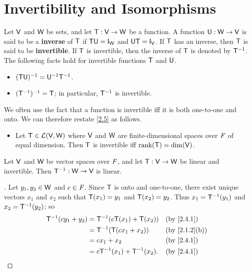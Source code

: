 \section{Invertibility and Isomorphisms}\label{sec:2.4}

\begin{defn}\label{2.4.1}
  Let \(\mathsf{V}\) and \(\mathsf{W}\) be sets, and let \(\mathsf{T} : \mathsf{V} \to \mathsf{W}\) be a function.
  A function \(\mathsf{U} : \mathsf{W} \to \mathsf{V}\) is said to be a \textbf{inverse} of \(\mathsf{T}\) if \(\T \U = \IT[\W]\) and \(\U \T = \IT[\V]\).
  If \(\mathsf{T}\) has an inverse, then \(\mathsf{T}\) is said to be \textbf{invertible}.
  If \(\mathsf{T}\) is invertible, then the inverse of \(\mathsf{T}\) is denoted by \(\mathsf{T}^{-1}\).
  The following facts hold for invertible functions \(\mathsf{T}\) and \(\mathsf{U}\).
  \begin{itemize}
    \item \((\mathsf{T} \mathsf{U})^{-1} = \mathsf{U}^{-1} \mathsf{T}^{-1}\).
    \item \((\mathsf{T}^{-1})^{-1} = \mathsf{T}\);
          in particular, \(\mathsf{T}^{-1}\) is invertible.
  \end{itemize}
  We often use the fact that a function is invertible iff it is both one-to-one and onto.
  We can therefore restate \cref{2.5} as follows.
  \begin{itemize}
    \item Let \(\mathsf{T} \in \mathcal{L}(\mathsf{V}, \mathsf{W})\) where \(\mathsf{V}\) and \(\mathsf{W}\) are finite-dimensional spaces over \(\mathit{F}\) of equal dimension.
          Then \(\mathsf{T}\) is invertible iff \(\rk{\T} = \dim(\V)\).
  \end{itemize}
\end{defn}

\begin{thm}\label{2.17}
  Let \(\mathsf{V}\) and \(\mathsf{W}\) be vector spaces over \(\mathit{F}\), and let \(\mathsf{T} : \mathsf{V} \to \mathsf{W}\) be linear and invertible.
  Then \(\mathsf{T}^{-1} : \mathsf{W} \to \mathsf{V}\) is linear.
\end{thm}

\begin{proof}[]
  Let \(y_1, y_2 \in \mathsf{W}\) and \(c \in \mathit{F}\).
  Since \(\mathsf{T}\) is onto and one-to-one, there exist unique vectors \(x_1\) and \(x_2\) such that \(\mathsf{T}(x_1) = y_1\) and \(\mathsf{T}(x_2) = y_2\).
  Thus \(x_1 = \mathsf{T}^{-1}(y_1)\) and \(x_2 = \mathsf{T}^{-1}(y_2)\);
  so
  \begin{align*}
    \T^{-1}(c y_1 + y_2) & = \T^{-1}(c \T(x_1) + \T(x_2))   &  & \by{2.4.1}    \\
                         & = \T^{-1}(\T(c x_1 + x_2))       &  & \by{2.1.2}[b] \\
                         & = c x_1 + x_2                    &  & \by{2.4.1}    \\
                         & = c \T^{-1}(x_1) + \T^{-1}(x_2). &  & \by{2.4.1}
  \end{align*}
\end{proof}

